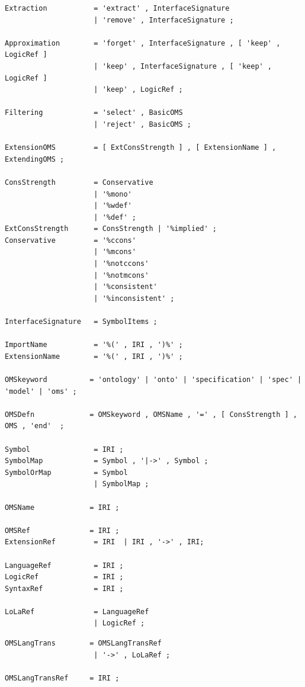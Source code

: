 \documentclass[10pt,fleqn,%
\ifpretendfinal
final%
\else
draft%
\fi,
]{scrreprt}
\begin{document}
\begin{lstlisting}[language=ebnf,escapeinside={<>},mathescape]
Extraction           = 'extract' , InterfaceSignature
                     | 'remove' , InterfaceSignature ;

Approximation        = 'forget' , InterfaceSignature , [ 'keep' , LogicRef ] 
                     | 'keep' , InterfaceSignature , [ 'keep' , LogicRef ] 
                     | 'keep' , LogicRef ;

Filtering            = 'select' , BasicOMS 
                     | 'reject' , BasicOMS ;

ExtensionOMS         = [ ExtConsStrength ] , [ ExtensionName ] , ExtendingOMS ;

ConsStrength         = Conservative
                     | '%mono'
                     | '%wdef'
                     | '%def' ;
ExtConsStrength      = ConsStrength | '%implied' ;
Conservative         = '%ccons'
                     | '%mcons'  
                     | '%notccons'  
                     | '%notmcons'  
                     | '%consistent'  
                     | '%inconsistent' ; 

InterfaceSignature   = SymbolItems ;

ImportName           = '%(' , IRI , ')%' ;
ExtensionName        = '%(' , IRI , ')%' ;

OMSkeyword          = 'ontology' | 'onto' | 'specification' | 'spec' | 'model' | 'oms' ;

OMSDefn             = OMSkeyword , OMSName , '=' , [ ConsStrength ] , OMS , 'end'  ; 

Symbol               = IRI ;
SymbolMap            = Symbol , '|->' , Symbol ;
SymbolOrMap          = Symbol
                     | SymbolMap ;

OMSName             = IRI ;

OMSRef              = IRI ;
ExtensionRef         = IRI  | IRI , '->' , IRI;

LanguageRef          = IRI ;
LogicRef             = IRI ;
SyntaxRef            = IRI ;

LoLaRef              = LanguageRef
                     | LogicRef ;
\end{lstlisting}

\begin{lstlisting}[language=ebnf,mathescape]
OMSLangTrans        = OMSLangTransRef
                     | '->' , LoLaRef ;

OMSLangTransRef     = IRI ;
\end{lstlisting}

\end{document}
